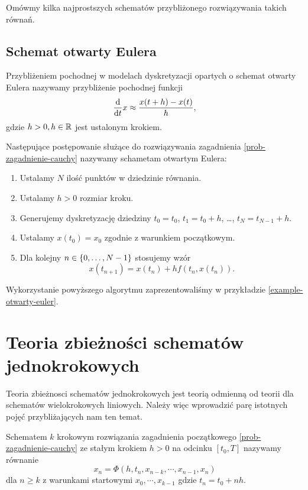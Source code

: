 \documentclass[12pt,a4paper]{report}
\begin{document}
Omówmy kilka najprostszych schematów przybliżonego rozwiązywania takich równań.

\subsection{Schemat otwarty Eulera}

\begin{definition}
Przybliżeniem pochodnej w modelach dyskretyzacji opartych o schemat otwarty Eulera nazywamy przybliżenie pochodnej funkcji
$$
\frac{\mathrm{d} {} }{\mathrm{d}{t}}x \approx \frac{x(t+h) - x(t)}{h},
$$
gdzie $h >0, h \in \mathbb{R} $ jest ustalonym krokiem. 
\end{definition}

\begin{algorithm}
Następujące postępowanie służące do rozwiązywania zagadnienia \ref{prob-zagadnienie-cauchy} nazywamy schametam otwartym Eulera:
\begin{enumerate}
\item Ustalamy $N$ ilość punktów w dziedzinie równania. 
\item Ustalamy $h>0$ rozmiar kroku.
\item Generujemy dyskretyzację dziedziny $t_0 = t_0$, $t_1 = t_0 + h$, \ldots, $t_N = t_{N-1}+h$. 
\item Ustalamy $x(t_0) = x_0$ zgodnie z warunkiem początkowym.
\item Dla kolejny $n \in \left\lbrace {0, \ldots, N-1} \right\rbrace$ stosujemy wzór
$$
x(t_{n+1}) = x(t_n) + h f(t_n, x(t_n)).
$$
\end{enumerate}
\end{algorithm}

Wykorzystanie powyższego algorytmu zaprezentowaliśmy w przykładzie \ref{example-otwarty-euler}.

\section{Teoria zbieżności schematów jednokrokowych}
Teoria zbieżnosci schematów jednokrokowych jest teorią odmienną od teorii dla schematów wielokrokowych liniowych. Należy więc wprowadzić parę istotnych pojęć przybliżających nam ten temat. 

\begin{definition} 
Schematem $k$ krokowym rozwiązania zagadnienia początkowego \ref{prob-zagadnienie-cauchy} ze stałym krokiem $h>0$ na odcinku $[t_0,T]$ nazywamy równanie
$$
x_n = \Phi (h,t_n,x_{n-k},\cdots,x_{n-1},x_n) \label{k-steps-scheme}
$$
dla $ n \geq k$ z warunkami startowymi $x_0,\cdots, x_{k-1}$ gdzie $t_n = t_0 + nh$.
\end{definition}
\end{document}

